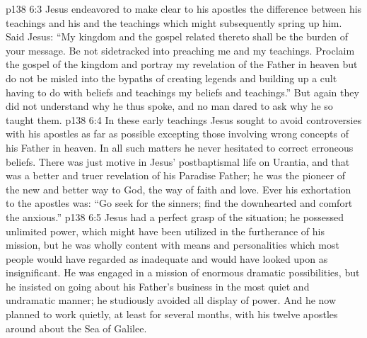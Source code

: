 \vs p138 6:3 \pc Jesus endeavored to make clear to his apostles the difference between his teachings and his  and the teachings which might subsequently spring up  him. Said Jesus: \textcolor{ubdarkred}{“My kingdom and the gospel related thereto shall be the burden of your message. Be not sidetracked into preaching  me and  my teachings. Proclaim the gospel of the kingdom and portray my revelation of the Father in heaven but do not be misled into the bypaths of creating legends and building up a cult having to do with beliefs and teachings  my beliefs and teachings.”} But again they did not understand why he thus spoke, and no man dared to ask why he so taught them.
\vs p138 6:4 In these early teachings Jesus sought to avoid controversies with his apostles as far as possible excepting those involving wrong concepts of his Father in heaven. In all such matters he never hesitated to correct erroneous beliefs. There was just  motive in Jesus’ postbaptismal life on Urantia, and that was a better and truer revelation of his Paradise Father; he was the pioneer of the new and better way to God, the way of faith and love. Ever his exhortation to the apostles was: \textcolor{ubdarkred}{“Go seek for the sinners; find the downhearted and comfort the anxious.”}
\vs p138 6:5 Jesus had a perfect grasp of the situation; he possessed unlimited power, which might have been utilized in the furtherance of his mission, but he was wholly content with means and personalities which most people would have regarded as inadequate and would have looked upon as insignificant. He was engaged in a mission of enormous dramatic possibilities, but he insisted on going about his Father’s business in the most quiet and undramatic manner; he studiously avoided all display of power. And he now planned to work quietly, at least for several months, with his twelve apostles around about the Sea of Galilee.

